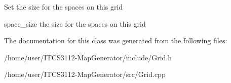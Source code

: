 Set the size for the spaces on this grid

space\+\_\+size the size for the spaces on this grid 

The documentation for this class was generated from the following files\+:\begin{DoxyCompactItemize}
\item 
/home/user/\+I\+T\+C\+S3112-\/\+Map\+Generator/include/Grid.\+h\item 
/home/user/\+I\+T\+C\+S3112-\/\+Map\+Generator/src/Grid.\+cpp\end{DoxyCompactItemize}
